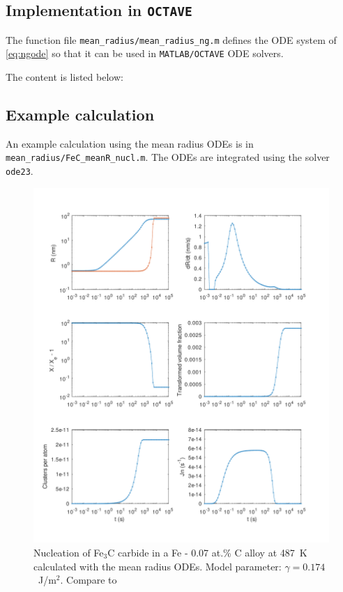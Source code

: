 \documentclass[12pt,a4paper]{article}
\begin{document}
\subsection{Implementation in \texttt{OCTAVE}}

The function file \texttt{mean\_radius/mean\_radius\_ng.m} defines the ODE system of \eqref{eq:ngode} so that it can be used in \texttt{MATLAB/OCTAVE} ODE solvers.

The content is listed below: 



\pagebreak

\subsection{Example calculation}

An example calculation using the mean radius ODEs is in \texttt{mean\_radius/FeC\_meanR\_nucl.m}. The ODEs are integrated using the solver \texttt{ode23}.

\begin{figure}[h]
\centering
\includegraphics[width=14cm]{../mean_radius/FeC_meanR_nucl.pdf} 
\caption{Nucleation of Fe$_3$C carbide in a Fe - 0.07 at.\% C alloy at 487~K calculated with the mean radius ODEs. Model parameter: $\gamma = 0.174$~J/m$^2$. Compare to \citet{Perez-2003-ID509}}
\end{figure}
\end{document}
